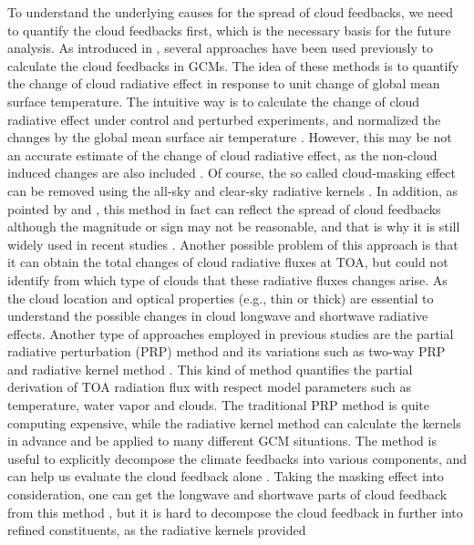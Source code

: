 

To understand the underlying causes for the spread of cloud feedbacks, we need to quantify the cloud feedbacks first, which is the necessary basis for the future analysis. As introduced in , several approaches have been used previously to calculate the cloud feedbacks in GCMs. The idea of these methods is to quantify the change of cloud radiative effect in response to unit change of global mean surface temperature. The intuitive way is to calculate the change of cloud radiative effect under control and perturbed experiments, and normalized the changes by the global mean surface air temperature \citep[e.g.,][]{Cess1990intercomparison,Cess1996cloud}. However, this may be not an accurate estimate of the change of cloud radiative effect, as  the non-cloud induced changes are also included \cite[e.g.,][]{Soden2004}. Of course, the so called cloud-masking effect can be removed using the all-sky and clear-sky radiative kernels \citep[Details in ][]{Shell2008}. In addition, as pointed by \cite{Soden2008} and \cite{Vial2013}, this method in fact can reflect the spread of cloud feedbacks although the magnitude or sign may not be reasonable, and that is why it is still widely used in recent studies \citep[e.g.,][]{Webb2015}. Another possible problem of this approach is that it can obtain the total changes of cloud radiative fluxes at TOA, but could not identify from which type of clouds that these radiative fluxes changes arise. As the cloud location and optical properties (e.g., thin or thick) are essential to understand the possible changes in cloud longwave and shortwave radiative effects. Another type of approaches employed in previous studies are the partial radiative perturbation (PRP) method \citep{Wetherald1988cloud} and its variations such as two-way PRP \citep[e.g.,][]{Colman1997} and radiative kernel method \citep[e.g.,][]{Soden2008,Shell2008,Huang2017,Pendergrass2018,Smith2020}. This kind of method quantifies the partial derivation of TOA radiation flux with respect model parameters such as temperature, water vapor and clouds. The traditional PRP method is quite computing expensive, while the radiative kernel method can calculate the kernels in advance and be applied to many different GCM situations. The method is useful to explicitly decompose the climate feedbacks into various components, and can help us evaluate the cloud feedback alone \citep[e.g.,][]{Soden2004,Soden2006,Soden2008}. Taking the masking effect into consideration, one can get the longwave and shortwave parts of cloud feedback from this method \citep[e.g.,][]{Soden2008,Caldwell2016quantifying}, but it is hard to decompose the cloud feedback in further into refined constituents, as the radiative kernels provided 